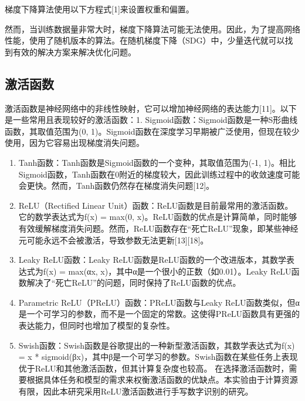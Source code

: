 \documentclass[11pt]{article}
\begin{document}
梯度下降算法使用以下方程式[1]来设置权重和偏置。

然而，当训练数据量非常大时，梯度下降算法可能无法使用。因此，为了提高网络性能，使用了随机版本的算法。在随机梯度下降（SDG）中，少量迭代就可以找到有效的解决方案来解决优化问题。
\subsection{激活函数}
\label{sec:org14d58e7}
激活函数是神经网络中的非线性映射，它可以增加神经网络的表达能力[11]。以下是一些常用且表现较好的激活函数：1. Sigmoid函数：Sigmoid函数是一种S形曲线函数，其取值范围为(0, 1)。Sigmoid函数在深度学习早期被广泛使用，但现在较少使用，因为它容易出现梯度消失问题。
\begin{enumerate}
\item Tanh函数：Tanh函数是Sigmoid函数的一个变种，其取值范围为(-1, 1)。相比Sigmoid函数，Tanh函数在0附近的梯度较大，因此训练过程中的收敛速度可能会更快。然而，Tanh函数仍然存在梯度消失问题[12]。
\item ReLU（Rectified Linear Unit）函数：ReLU函数是目前最常用的激活函数。它的数学表达式为f(x) = max(0, x)。ReLU函数的优点是计算简单，同时能够有效缓解梯度消失问题。然而，ReLU函数存在“死亡ReLU”现象，即某些神经元可能永远不会被激活，导致参数无法更新[13][18]。
\item Leaky ReLU函数：Leaky ReLU函数是ReLU函数的一个改进版本，其数学表达式为f(x) = max(αx, x)，其中α是一个很小的正数（如0.01）。Leaky ReLU函数解决了“死亡ReLU”的问题，同时保持了ReLU函数的优点。
\item Parametric ReLU（PReLU）函数：PReLU函数与Leaky ReLU函数类似，但α是一个可学习的参数，而不是一个固定的常数。这使得PReLU函数具有更强的表达能力，但同时也增加了模型的复杂性。
\item Swish函数：Swish函数是谷歌提出的一种新型激活函数，其数学表达式为f(x) = x * sigmoid(βx)，其中β是一个可学习的参数。Swish函数在某些任务上表现优于ReLU和其他激活函数，但其计算复杂度也较高。
在选择激活函数时，需要根据具体任务和模型的需求来权衡激活函数的优缺点。本实验由于计算资源有限，因此本研究采用ReLU激活函数进行手写数字识别的研究。
\end{enumerate}
\end{document}
